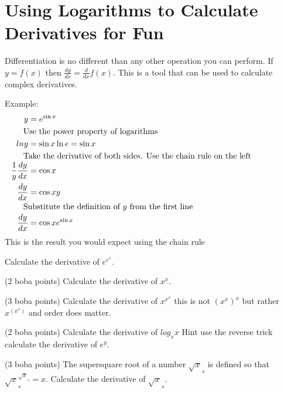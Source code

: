 \section*{Using Logarithms to Calculate Derivatives for Fun}

Differentiation is no different than any other operation you can perform.
If $y=f(x)$ then $\frac{dy}{dx} = \frac{d}{dx}f(x)$. This is a tool that can be used to calculate complex derivatives.

Example:
\begin{equation*}
  \begin{aligned}
    y &= e^{\sin x} \\
    \noalign {Use the power property of logarithms}
    ln y &= \sin x \ln e = \sin x \\
    \noalign {Take the derivative of both sides. Use the chain rule on the left}
    \frac{1}{y} \frac{dy}{dx} &= \cos x \\
    \frac{dy}{dx} &= \cos x y \\
    \noalign {Substitute the definition of $y$ from the first line}
    \frac{dy}{dx} &= \cos x e^{\sin x} \\
  \end{aligned}
\end{equation*}
This is the result you would expect using the chain rule
\begin{questions}
  \question
  Calculate the derivative of $e^{e^x}$.
  \begin{solution}[1.5in]
  \end{solution}
  \question (2 boba points)
  Calculate the derivative of $x^x$.
  \begin{solution}[1.5in]
  \end{solution}
  \question (3 boba points)
  Calculate the derivative of $x^{x^x}$ this is not $(x^x)^x$ but rather $x^{(x^x)}$ and order does matter.
  \begin{solution}[1.5in]
  \end{solution}
  \question (2 boba points)
  Calculate the derivative of $log_x x$ Hint use the reverse trick calculate the derivative of $e^y$.
  \begin{solution}[1.5in]
  \end{solution}
  \question (3 boba points)
  The supersquare root of a number $\sqrt{x}_s$ is defined so that $\sqrt{x}_s^{\sqrt{x}_s} = x$. Calculate the derivative of $\sqrt{x}_s$.
  \begin{solution}[1.5in]
  \end{solution}
\end{questions}

